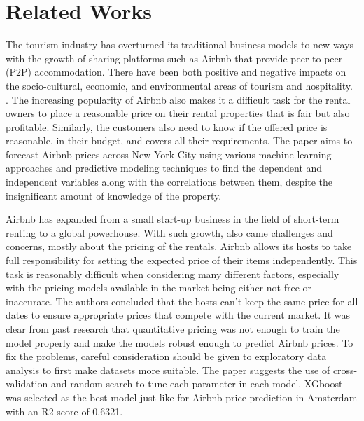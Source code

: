 \documentclass[conference]{IEEEtran}
\begin{document}
\section{Related Works}
The tourism industry has overturned its traditional business models to new ways with the growth of sharing platforms such as Airbnb that provide peer-to-peer (P2P) accommodation. There have been both positive and negative impacts on the socio-cultural, economic, and environmental areas of tourism and hospitality. . The increasing popularity of Airbnb also makes it a difficult task for the rental owners to place a reasonable price on their rental properties that is fair but also profitable. Similarly, the customers also need to know if the offered price is reasonable, in their budget, and covers all their requirements. The paper aims to forecast Airbnb prices across New York City using various machine learning approaches and predictive modeling techniques to find the dependent and independent variables along with the correlations between them, despite the insignificant amount of knowledge of the property.\newline

Airbnb has expanded from a small start-up business in the field of short-term renting to a global powerhouse. With such growth, also came challenges and concerns, mostly about the pricing of the rentals. Airbnb allows its hosts to take full responsibility for setting the expected price of their items independently. This task is reasonably difficult when considering many different factors, especially with the pricing models available in the market being either not free or inaccurate. The authors concluded that the hosts can’t keep the same price for all dates to ensure appropriate prices that compete with the current market. It was clear from past research that quantitative pricing was not enough to train the model properly and make the models robust enough to predict Airbnb prices. To fix the problems, careful consideration should be given to exploratory data analysis to first make datasets more suitable. The paper suggests the use of cross-validation and random search to tune each parameter in each model. XGboost was selected as the best model just like for Airbnb price prediction in Amsterdam with an R2 score of 0.6321.\newline
\end{document}
